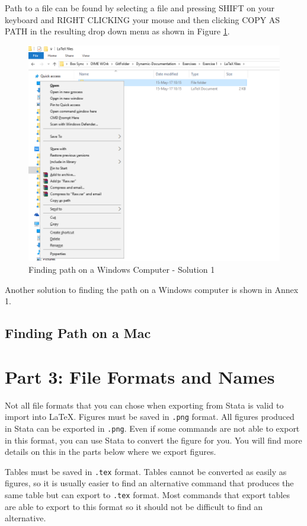 \documentclass[]{article}
\begin{document}
Path to a file can be found by selecting a file and pressing {\color{red}SHIFT on your keyboard and RIGHT CLICKING your mouse and then clicking COPY AS PATH in the resulting drop down menu} as shown in Figure \ref{fig:pathwin3}.

\begin{figure}[H]
	\centering
	\includegraphics[width=0.9\linewidth]{img/pathwin3}
	\caption{Finding path on a Windows Computer - Solution 1}
	\label{fig:pathwin3}
\end{figure}


Another solution to finding the path on a Windows computer is shown in Annex 1.
	
\subsection*{Finding Path on a Mac}


\section*{Part 3: File Formats and Names}
Not all file formats that you can chose when exporting from Stata is valid to import into {\LaTeX}. Figures must be saved in \texttt{.png} format. All figures produced in Stata can be exported in \texttt{.png}. Even if some commands are not able to export in this format, you can use Stata to convert the figure for you. You will find more details on this in the parts below where we export figures. 

Tables must be saved in \texttt{.tex} format. Tables cannot be converted as easily as figures, so it is usually easier to find an alternative command that produces the same table but can export to \texttt{.tex} format. Most commands that export tables are able to export to this format so it should not be difficult to find an alternative.
\end{document}
